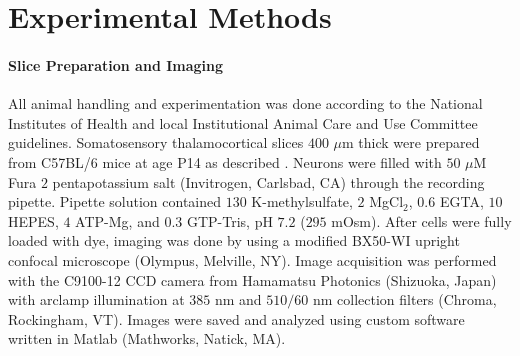 \documentclass[10pt]{article}
\providecommand{\ve}[1]{\boldsymbol{#1}}
\providecommand{\ve}[1]{\boldsymbol{#1}}
\DeclareMathOperator*{\argmax}{argmax}
\newcommand{\thetn}{\ve{\theta}}
\newcommand{\p}{P_{\thetn}}
\newcommand{\Ca}{[\text{Ca}^{2+}]}
\begin{document}
%
%

\section*{Experimental Methods} \label{sec:exp_meth}

\paragraph{Slice Preparation and Imaging}

All animal handling and experimentation was done according to the National Institutes of Health and local Institutional Animal Care and Use Committee guidelines. Somatosensory thalamocortical slices $400$ $\mu$m thick were prepared from C57BL/6 mice at age P14 as described \cite{MacLeanYuste05}. Neurons were filled with $50$ $\mu$M Fura $2$ pentapotassium salt (Invitrogen, Carlsbad, CA) through the recording pipette. Pipette solution contained $130$ K-methylsulfate, $2$ MgCl$_2$, $0.6$ EGTA, $10$ HEPES, $4$ ATP-Mg, and $0.3$ GTP-Tris, pH $7.2$ ($295$ mOsm).  After cells were fully loaded with dye, imaging was done by using a modified BX50-WI upright confocal microscope (Olympus, Melville, NY).  Image acquisition was performed with the C9100-12 CCD camera from Hamamatsu Photonics (Shizuoka, Japan) with arclamp illumination at $385$ nm and $510/60$ nm collection filters (Chroma, Rockingham, VT).  Images were saved and analyzed using custom software written in Matlab (Mathworks, Natick, MA).
\end{document}
